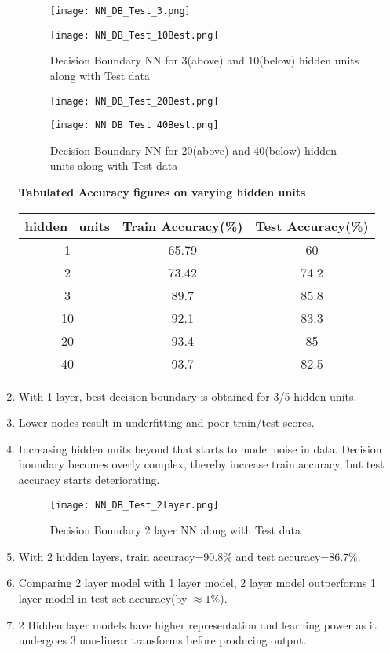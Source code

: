 \documentclass{article}
\newcommand{\bld}[1]{\textbf{#1}}
\begin{document}
\begin{enumerate}
\begin{figure}[h]
\vspace*{-2cm}
\hspace*{-1.5cm}
\centering
\texttt{[image: NN\_DB\_Test\_3.png]}
\vspace*{-1.5cm}
\caption{Decision Boundary NN for 3(above) and 10(below) hidden units along with Test data}
\hspace*{-1.5cm}
\centering
\texttt{[image: NN\_DB\_Test\_10Best.png]}
\end{figure}

\begin{figure}[h]
\vspace*{-2cm}
\hspace*{-1.5cm}
\centering
\texttt{[image: NN\_DB\_Test\_20Best.png]}
\vspace*{-1.5cm}
\caption{Decision Boundary NN for 20(above) and 40(below) hidden units along with Test data}
\hspace*{-1.5cm}
\centering
\texttt{[image: NN\_DB\_Test\_40Best.png]}
\end{figure}

\clearpage
\bld{Tabulated Accuracy figures on varying hidden units}
\begin{center}
 \begin{tabular}{||c|c|c||} 
 \hline
 hidden\_units & Train Accuracy(\%) & Test Accuracy(\%) \\ [0.5ex] 
 \hline\hline
 1 & 65.79 & 60\\
 \hline
 2 & 73.42 & 74.2\\ 
 \hline
 3 & 89.7 & 85.8\\ 
 \hline
 10 & 92.1 & 83.3\\ 
 \hline
 20 & 93.4 & 85\\ 
 \hline
 40 & 93.7 & 82.5\\ 
 \hline
\end{tabular}
\end{center}
	\item With 1 layer, best decision boundary is obtained for 3/5 hidden units.
	\item Lower nodes result in underfitting and poor train/test scores.
	\item Increasing hidden units beyond that starts to model noise in data. Decision boundary becomes overly complex, thereby increase train accuracy, but test accuracy starts deteriorating.
\begin{figure}[h]
\hspace*{-1.5cm}
\centering
\texttt{[image: NN\_DB\_Test\_2layer.png]}
\vspace*{-1.5cm}
\caption{Decision Boundary 2 layer NN along with Test data}
\end{figure}
	\item With 2 hidden layers, train accuracy=90.8\% and test accuracy=86.7\%.
	\item Comparing 2 layer model with 1 layer model, 2 layer model outperforms 1 layer model in test set accuracy(by $\approx 1\%$).
	\item 2 Hidden layer models have higher representation and learning power as it undergoes 3 non-linear transforms before producing output.
\end{enumerate}
\end{document}
